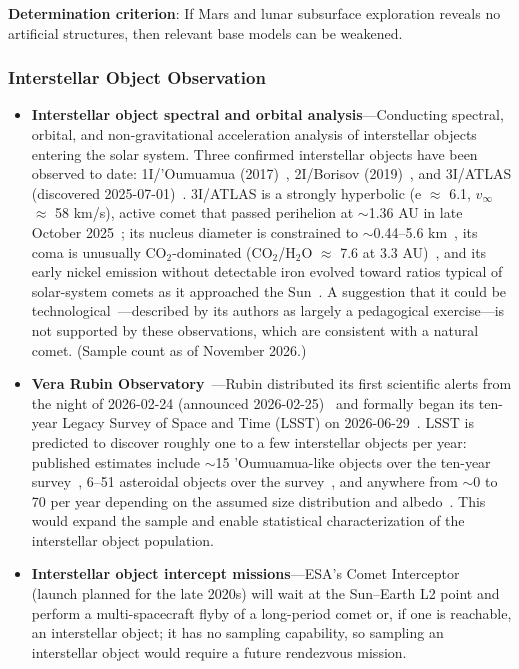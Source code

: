 \documentclass[aps,prd,twocolumn,superscriptaddress,nofootinbib]{revtex4-2}
\begin{document}
\textbf{Determination criterion}: If Mars and lunar subsurface exploration reveals no artificial structures, then relevant base models can be weakened.

\subsubsection{Interstellar Object Observation}\label{sec:interstellar-objects}

\begin{itemize}
  \item \textbf{Interstellar object spectral and orbital analysis}---Conducting spectral, orbital, and non-gravitational acceleration analysis of interstellar objects entering the solar system. Three confirmed interstellar objects have been observed to date: 1I/'Oumuamua (2017)~\cite{Meech2017}, 2I/Borisov (2019)~\cite{Guzik2020}, and 3I/ATLAS (discovered 2025-07-01)~\cite{NASA_3IATLAS}. 3I/ATLAS is a strongly hyperbolic (e $\approx$ 6.1, $v_{\infty}$ $\approx$ 58 km/s), active comet that passed perihelion at ${\sim}$1.36 AU in late October 2025~\cite{Seligman2025,NASA_3IATLAS}; its nucleus diameter is constrained to ${\sim}$0.44--5.6 km~\cite{Jewitt2025}, its coma is unusually CO$_{2}$-dominated (CO$_{2}$/H$_{2}$O $\approx$ 7.6 at 3.3 AU)~\cite{Cordiner2025}, and its early nickel emission without detectable iron evolved toward ratios typical of solar-system comets as it approached the Sun~\cite{Hutsemekers2026}. A suggestion that it could be technological~\cite{Hibberd2025}---described by its authors as largely a pedagogical exercise---is not supported by these observations, which are consistent with a natural comet. (Sample count as of November 2026.)
  \item \textbf{Vera Rubin Observatory}~\cite{Ivezic2019}---Rubin distributed its first scientific alerts from the night of 2026-02-24 (announced 2026-02-25)~\cite{RubinObs2026} and formally began its ten-year Legacy Survey of Space and Time (LSST) on 2026-06-29~\cite{RubinSurveyProgress}. LSST is predicted to discover roughly one to a few interstellar objects per year: published estimates include ${\sim}$15 'Oumuamua-like objects over the ten-year survey~\cite{Hoover2022}, 6--51 asteroidal objects over the survey~\cite{Dorsey2025}, and anywhere from ${\sim}$0 to 70 per year depending on the assumed size distribution and albedo~\cite{Marceta2023}. This would expand the sample and enable statistical characterization of the interstellar object population.
  \item \textbf{Interstellar object intercept missions}---ESA's Comet Interceptor~\cite{Snodgrass2019} (launch planned for the late 2020s) will wait at the Sun--Earth L2 point and perform a multi-spacecraft flyby of a long-period comet or, if one is reachable, an interstellar object; it has no sampling capability, so sampling an interstellar object would require a future rendezvous mission.
\end{itemize}
\end{document}
